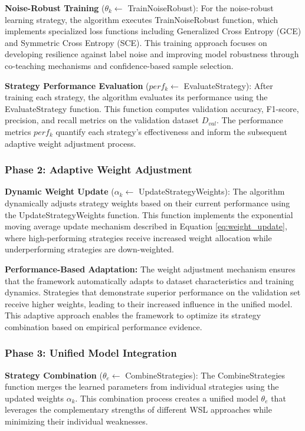 \documentclass{ieeeaccess}
\begin{document}
\textbf{Noise-Robust Training} ($\theta_k \leftarrow$ TrainNoiseRobust): For the noise-robust learning strategy, the algorithm executes TrainNoiseRobust function, which implements specialized loss functions including Generalized Cross Entropy (GCE) and Symmetric Cross Entropy (SCE). This training approach focuses on developing resilience against label noise and improving model robustness through co-teaching mechanisms and confidence-based sample selection.

\textbf{Strategy Performance Evaluation} ($perf_k \leftarrow$ EvaluateStrategy): After training each strategy, the algorithm evaluates its performance using the EvaluateStrategy function. This function computes validation accuracy, F1-score, precision, and recall metrics on the validation dataset $D_{val}$. The performance metrics $perf_k$ quantify each strategy's effectiveness and inform the subsequent adaptive weight adjustment process.

\subsubsection{Phase 2: Adaptive Weight Adjustment}

\textbf{Dynamic Weight Update} ($\alpha_k \leftarrow$ UpdateStrategyWeights): The algorithm dynamically adjusts strategy weights based on their current performance using the UpdateStrategyWeights function. This function implements the exponential moving average update mechanism described in Equation \ref{eq:weight_update}, where high-performing strategies receive increased weight allocation while underperforming strategies are down-weighted.

\textbf{Performance-Based Adaptation:} The weight adjustment mechanism ensures that the framework automatically adapts to dataset characteristics and training dynamics. Strategies that demonstrate superior performance on the validation set receive higher weights, leading to their increased influence in the unified model. This adaptive approach enables the framework to optimize its strategy combination based on empirical performance evidence.

\subsubsection{Phase 3: Unified Model Integration}

\textbf{Strategy Combination }($\theta_e \leftarrow$ CombineStrategies): The CombineStrategies function merges the learned parameters from individual strategies using the updated weights $\alpha_k$. This combination process creates a unified model $\theta_e$ that leverages the complementary strengths of different WSL approaches while minimizing their individual weaknesses.
\end{document}
